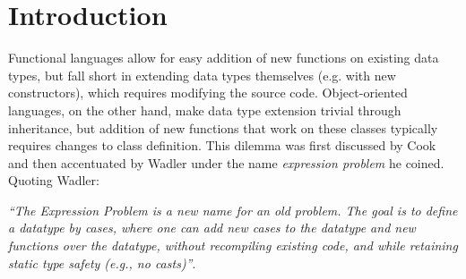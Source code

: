 \section{Introduction} %
\label{sec:intro}





Functional languages allow for easy addition of new functions on existing data 
types, but fall short in extending data types themselves (e.g. with new constructors), 
which requires modifying the source code. Object-oriented languages, on the 
other hand, make data type extension trivial through inheritance, but addition 
of new functions that work on these classes typically requires changes to class 
definition. This dilemma was first discussed by Cook\cite{Cook90} and then 
accentuated by Wadler\cite{exprproblem} under the name \emph{expression problem} 
he coined. Quoting Wadler:

\emph{``The Expression Problem is a new name for an old problem. The goal is
to define a datatype by cases, where one can add new cases to the
datatype and new functions over the datatype, without recompiling
existing code, and while retaining static type safety (e.g., no
casts)''}.

